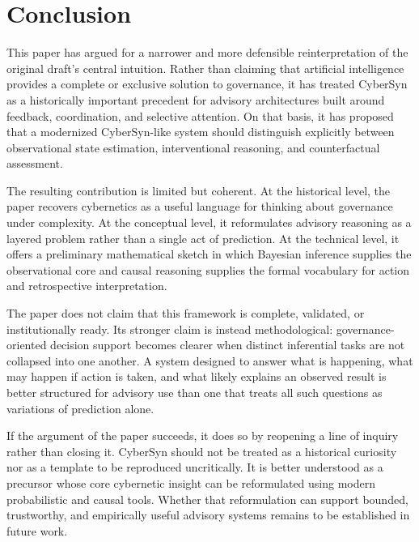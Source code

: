\documentclass[11pt]{article}
\begin{document}
\section{Conclusion}

This paper has argued for a narrower and more defensible reinterpretation of the original draft's central intuition. Rather than claiming that artificial intelligence provides a complete or exclusive solution to governance, it has treated CyberSyn as a historically important precedent for advisory architectures built around feedback, coordination, and selective attention. On that basis, it has proposed that a modernized CyberSyn-like system should distinguish explicitly between observational state estimation, interventional reasoning, and counterfactual assessment.

The resulting contribution is limited but coherent. At the historical level, the paper recovers cybernetics as a useful language for thinking about governance under complexity. At the conceptual level, it reformulates advisory reasoning as a layered problem rather than a single act of prediction. At the technical level, it offers a preliminary mathematical sketch in which Bayesian inference supplies the observational core and causal reasoning supplies the formal vocabulary for action and retrospective interpretation.

The paper does not claim that this framework is complete, validated, or institutionally ready. Its stronger claim is instead methodological: governance-oriented decision support becomes clearer when distinct inferential tasks are not collapsed into one another. A system designed to answer what is happening, what may happen if action is taken, and what likely explains an observed result is better structured for advisory use than one that treats all such questions as variations of prediction alone.

If the argument of the paper succeeds, it does so by reopening a line of inquiry rather than closing it. CyberSyn should not be treated as a historical curiosity nor as a template to be reproduced uncritically. It is better understood as a precursor whose core cybernetic insight can be reformulated using modern probabilistic and causal tools. Whether that reformulation can support bounded, trustworthy, and empirically useful advisory systems remains to be established in future work.
\end{document}
